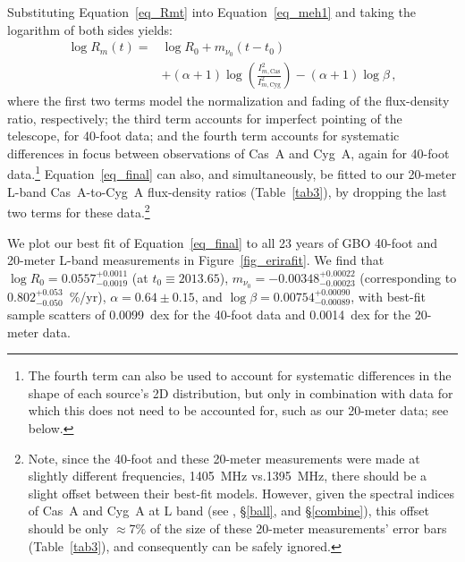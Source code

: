 \documentclass[fleqn,usenatbib]{mnras}
\newcommand{\Imcyg}{\mbox{$I^2_{m,\mathrm{Cyg}}$}}
\newcommand{\Imcas}{\mbox{$I^2_{m,\mathrm{Cas}}$}}
\begin{document}
Substituting Equation~\ref{eq_Rmt} into Equation~\ref{eq_meh1} and taking the logarithm of both sides yields:
\begin{equation} \label{eq_final}
\begin{split}
\log R_m(t) = &\log R_0 + m_{\nu_0}(t-t_0) \\ 
& +(\alpha+1)\log\left({\frac{\Imcas}{\Imcyg}}\right)-(\alpha+1)\log\beta  \, ,
\end{split}
\end{equation}
where the first two terms model the normalization and fading of the flux-density ratio, respectively; the third term accounts for imperfect pointing of the telescope, for 40-foot data; and the fourth term accounts for systematic differences in focus between observations of Cas~A and Cyg~A, again for 40-foot data.\footnote{The fourth term can also be used to account for systematic differences in the shape of each source's 2D distribution, but only in combination with data for which this does not need to be accounted for, such as our 20-meter data; see below.}  Equation~\ref{eq_final} can also, and simultaneously, be fitted to our 20-meter L-band Cas~A-to-Cyg~A flux-density ratios (Table~\ref{tab3}), by dropping the last two terms for these data.\footnote{Note, since the 40-foot and these 20-meter measurements were made at slightly different frequencies, 1405~MHz vs.\@ 1395~MHz, there should be a slight offset between their best-fit models.  However, given the spectral indices of Cas~A and Cyg~A at L band (see \citealt{b77}, \S\ref{ball}, and \S\ref{combine}), this offset should be only $\approx$7\% of the size of these 20-meter measurements' error bars (Table~\ref{tab3}), and consequently can be safely ignored.}

We plot our best fit of Equation~\ref{eq_final} to all 23 years of GBO 40-foot and 20-meter L-band measurements in Figure~\ref{fig_erirafit}.  We find that $\log R_0 = 0.0557^{+0.0011}_{-0.0019}$ (at $t_0 \equiv 2013.65$), $m_{\nu_0} = -0.00348^{+0.00022}_{-0.00023}$ (corresponding to $0.802^{+0.053}_{-0.050}$~\%/yr), $\alpha = 0.64 \pm 0.15$, and $\log\beta = 0.00754^{+0.00090}_{-0.00089}$, with best-fit sample scatters of 0.0099~dex for the 40-foot data and 0.0014~dex for the 20-meter data.    
\end{document}
